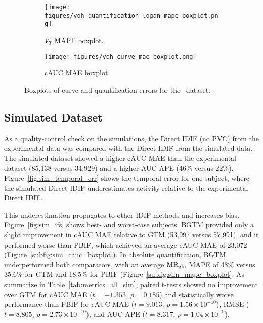\begin{figure}[h]
	\centering
	\begin{subfigure}[b]{0.45\textwidth}
		\texttt{[image: figures/yoh\_quantification\_logan\_mape\_boxplot.png]}
		\caption{\(V_T\) MAPE boxplot.}
		\label{subfig:yoh_mape_boxplot}
	\end{subfigure}
	\begin{subfigure}[b]{0.45\textwidth}
		\texttt{[image: figures/yoh\_curve\_mae\_boxplot.png]}
		\caption{cAUC MAE boxplot.}
		\label{subfig:yoh_cauc_boxplot}
	\end{subfigure}
	\caption{Boxplots of curve and quantification errors for the \yohimbine\ dataset.}
	\label{fig:yoh_boxplots}
\end{figure}

\subsection{Simulated Dataset}
As a quality-control check on the simulations, the Direct IDIF (no PVC) from the experimental data was compared with the Direct IDIF from the simulated data.
The simulated dataset showed a higher cAUC MAE than the experimental dataset (85{,}138 versus 34{,}929) and a higher AUC APE (46\% versus 22\%).
Figure~\ref{fig:sim_temporal_err} shows the temporal error for one subject, where the simulated Direct IDIF underestimates activity relative to the experimental Direct IDIF.

This underestimation propagates to other IDIF methods and increases bias.
Figure~\ref{fig:sim_ifs} shows best- and worst-case subjects.
BGTM provided only a slight improvement in cAUC MAE relative to GTM (53{,}997 versus 57{,}991), and it performed worse than PBIF, which achieved an average cAUC MAE of 23{,}072 (Figure~\ref{subfig:sim_cauc_boxplot}).
In absolute quantification, BGTM underperformed both comparators, with an average \(\text{MR}_{\text{glu}}\) MAPE of 48\% versus 35.6\% for GTM and 18.5\% for PBIF (Figure~\ref{subfig:sim_mape_boxplot}.
As summarize in Table~\ref{tab:metrics_all_sim}, paired t-tests showed no improvement over GTM for cAUC MAE (\(t=-1.353,\,p=0.185\)) and statistically worse performance than PBIF for cAUC MAE (\(t=9.013,\,p=1.56\times10^{-10}\)), RMSE (\(t=8.805,\,p=2.73\times10^{-10}\)), and AUC APE (\(t=8.317,\,p=1.04\times10^{-9}\)).


